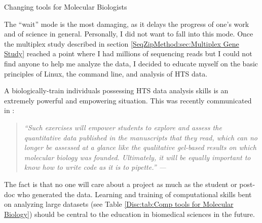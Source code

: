     \begin{table} %
      \caption[Changing tools for Molecular Biologists] 
        {
         Changing tools for Molecular Biologists
         }
       \label{Disc:tab:Comp tools for Molecular Biology}
       
       \end{table}

    The ``wait'' mode is the most damaging, as it delays the progress of one's work and  of science in general. Personally, I did not want to fall into this mode. Once the multiplex study described in section \ref{SeqZipMethod:sec:Multiplex Gene Study} reached a point where I had millions of sequencing reads but I could not find anyone to help me analyze the data, I decided to educate myself on the basic principles of Linux, the command line, and analysis of HTS data.

    A biologically-train individuals possessing HTS data analysis skills is an extremely powerful and empowering situation. This was recently communicated in \citet{Plocik2013}:

    \begin{quote} %
      \itshape 
      ``Such exercises will empower students to explore and assess the quantitative data published in the manuscripts that they read, which can no longer be assessed at a glance like the qualitative gel-based results on which molecular biology was founded. Ultimately, it will be equally important to know how to write code as it is to pipette.'' --- \citep{Plocik2013}
      \singlespacing
      \end{quote}

    The fact is that no one will care about a project as much as the student or post-doc who generated the data. Learning and training of computational skills bent on analyzing large datasets (see Table \ref{Disc:tab:Comp tools for Molecular Biology}) should be central to the education in biomedical sciences in the future.

\cleardoublepage